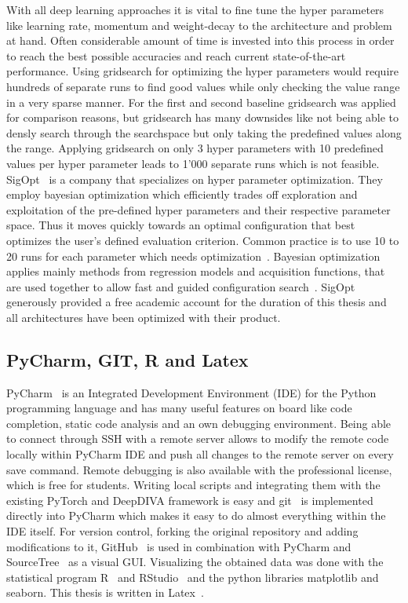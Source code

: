 With all deep learning approaches it is vital to fine tune the hyper parameters like learning rate, momentum and weight-decay to the architecture and problem at hand. Often considerable amount of time is invested into this process in order to reach the best possible accuracies and reach current state-of-the-art performance. Using gridsearch for optimizing the hyper parameters would require hundreds of separate runs to find good values while only checking the value range in a very sparse manner. For the first and second baseline gridsearch was applied for comparison reasons, but gridsearch has many downsides like not being able to densly search through the searchspace but only taking the predefined values along the range. Applying gridsearch on only 3 hyper parameters with 10 predefined values per hyper parameter leads to 1'000 separate runs which is not feasible. SigOpt~\cite{sigopt} is a company that specializes on hyper parameter optimization. They employ bayesian optimization which efficiently trades off exploration and exploitation of the pre-defined hyper parameters and their respective parameter space. Thus it moves quickly towards an optimal configuration that best optimizes the user's defined evaluation criterion. Common practice is to use 10 to 20 runs for each parameter which needs optimization~\cite{sigoptObservationBudget}. Bayesian optimization applies mainly methods from regression models and acquisition functions, that are used together to allow fast and guided configuration search~\cite{sigoptBayesian}. SigOpt generously provided a free academic account for the duration of this thesis and all architectures have been optimized with their product. \\


\subsection{PyCharm, GIT, R and Latex}

PyCharm~\cite{PyCharm} is an Integrated Development Environment (IDE) for the Python programming language and has many useful features on board like code completion, static code analysis and an own debugging environment. Being able to connect through SSH with a remote server allows to modify the remote code locally within PyCharm IDE and push all changes to the remote server on every save command. Remote debugging is also available with the professional license, which is free for students. Writing local scripts and integrating them with the existing PyTorch and DeepDIVA framework is easy and git~\cite{git2019} is implemented directly into PyCharm which makes it easy to do almost everything within the IDE itself.
For version control, forking the original repository and adding modifications to it, GitHub~\cite{GitHub} is used in combination with PyCharm and SourceTree~\cite{SourceTree} as a visual GUI.
Visualizing the obtained data was done with the statistical program R~\cite{statR} and RStudio~\cite{rstudio} and the python libraries matplotlib and seaborn. This thesis is written in Latex~\cite{latexProject2019}.\\


